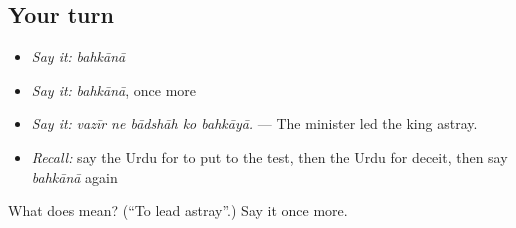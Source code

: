 \subsection*{Your turn}
\begin{itemize}
\raggedright
  \item \emph{Say it:} \emph{bahkānā}
  \item \emph{Say it:} \emph{bahkānā}, once more
  \item \emph{Say it:} \emph{vazīr ne bādshāh ko bahkāyā.} — The minister led the king astray.
  \item \emph{Recall:} say the Urdu for to put to the test, then the Urdu for deceit, then say \emph{bahkānā} again
\end{itemize}

\begin{tcolorbox}[breakable,colback=teal!4,colframe=teal!35!black,title={Before you move on}]
What does  mean? (\textquotedblleft{}To lead astray\textquotedblright{}.) Say it once more.
\end{tcolorbox}

